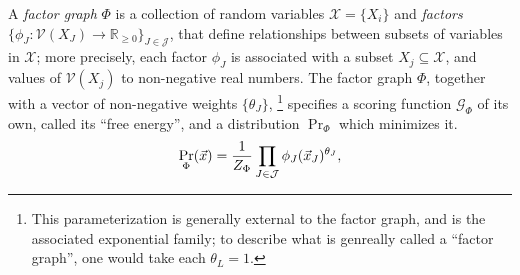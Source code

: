 \documentclass{article}
\theoremstyle{plain}
\theoremstyle{definition}
\theoremstyle{remark}
\newcommand{\V}{\mathcal V}
\numberwithin{equation}{section}
\begin{document}
\begin{defn}
  A \emph{factor graph} $\Phi$ is a collection of random variables
        $\mathcal X = \{X_i\}$ and \emph{factors}
       $\{\phi_J\colon \V(X_J) \to \mathbb R_{\geq0}\}_{J \in
         \mathcal J }$, %
        that define relationships between subsets of variables in
        $\mathcal X$;
more precisely, each factor $\phi_J$ is associated with a subset
$X_j\subseteq \mathcal{X}$,
and values of $\V(X_j)$ to non-negative real numbers.
The factor graph $\Phi$,
together with a vector of non-negative weights $\{ \theta_J \}$,%
	\footnote{This parameterization is generally external to the factor graph, and is the associated exponential family; to describe what is genreally called a ``factor graph'', one would take each $\theta_L=1$.}
specifies a scoring function $\mathcal G_\Phi$ of its own, called its ``free energy'', and a distribution $\Pr_{\Phi}$ which minimizes it.
	\[ \Pr_\Phi(\vec x)
		= \frac{1}{Z_\Phi} \prod_{J \in \cal J} \phi_J(\vec
                x_J)^{\theta_J}, %
\]
\end{defn}
\end{document}
